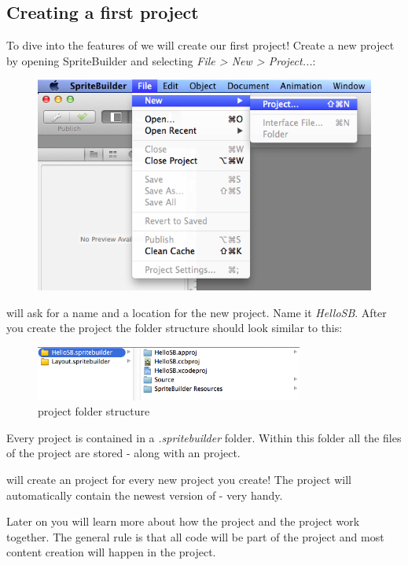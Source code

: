\subsection{Creating a first project}
To dive into the features of \SB{} we will create our first project! 
Create a new project by opening SpriteBuilder and selecting \textit{File > New >
Project...}:
\begin{figure}[H]
		\centering
		\includegraphics[width=0.9\linewidth]{images/cocos2d/setup/spritebuilder_new_project.png}     
\end{figure}

\SB{} will ask for a name and a location for the new project. Name it
\textit{HelloSB}. After you create the project the folder structure should look similar to this:
\begin{figure}[H]
		\centering
		\includegraphics[width=250pt]{images/cocos2d/setup/project_structure.png}     
		\caption{\SB{} project folder structure}
\end{figure}

Every \SB{} project is contained in a \textit{.spritebuilder} folder. Within
this folder all the files of the \SB{} project are stored - along with an \xcode{}
project. 

\begin{lamp}[frametitle={\SB{} and Xcode}] 
\SB{} will create an \xcode{} project for every new project you create! The
\xcode{} project will automatically contain the newest version of \cocos{} -
very handy.
\end{lamp}

Later on you will learn more about how the \SB{} project and the \xcode{}
project work together. The general rule is that all code will be part of the
\xcode{} project and most content creation will happen in the \SB{} project.

